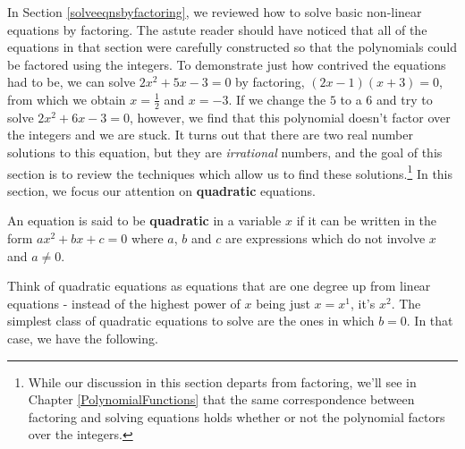 \documentclass{ximera}
\begin{document}
	\author{Stitz-Zeager}




\setcounter{footnote}{0}

\label{AppQuadEqus}

In Section \ref{solveeqnsbyfactoring}, we reviewed how to solve basic non-linear equations by factoring.  The astute reader should have noticed that all of the equations in that section were carefully constructed so that the polynomials could be factored using the integers.  To demonstrate just how contrived the equations had to be, we can solve $2x^2+5x-3=0$ by factoring, $(2x-1)(x+3) = 0$, from which we obtain $x = \frac{1}{2}$ and $x = -3$.  If we change the $5$ to a $6$ and try to solve $2x^2 + 6x - 3 = 0$, however, we find that this polynomial doesn't factor over the integers and we are stuck.  It turns out that there are two real number solutions to this equation, but they are \textit{irrational} numbers, and the goal of this section is to review the techniques which allow us to find these solutions.\footnote{While our discussion in this section departs from factoring, we'll see in Chapter \ref{PolynomialFunctions} that the same correspondence between factoring and solving equations holds whether or not the polynomial factors over the integers.}  In this section, we focus our attention on \textbf{quadratic} equations.

\medskip

\colorbox{ResultColor}{\bbm

\begin{defn}\label{quadeqndefn} An equation is said to be \textbf{quadratic} in a variable $x$ if it can be written in the form $ax^2 + bx + c = 0$ where $a$, $b$ and $c$ are expressions which do not involve $x$ and $a \neq 0$.

\end{defn}

\ebm}

\medskip

Think of quadratic equations as equations that are one degree up from linear equations - instead of the highest power of $x$ being just $x = x^1$, it's $x^2$.  The simplest class of quadratic equations to solve are the ones in which $b = 0$.  In that case, we have the following.

\medskip

\label{extractingthesquareroot}
\end{document}
